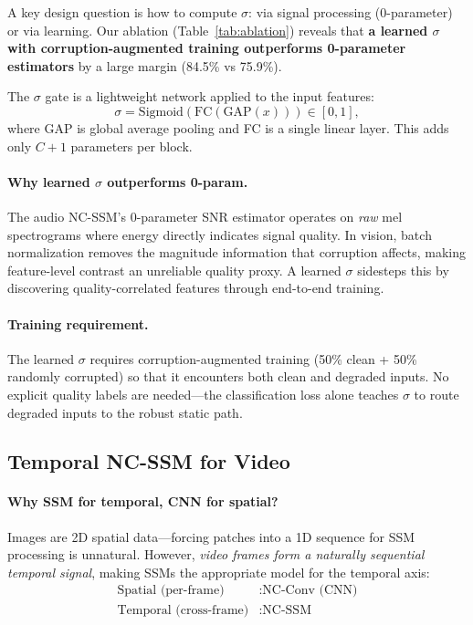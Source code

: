 \documentclass[10pt,twocolumn,letterpaper]{article}
\begin{document}
A key design question is how to compute $\sigma$: via signal processing (0-parameter) or via learning.
Our ablation (Table~\ref{tab:ablation}) reveals that \textbf{a learned $\sigma$ with corruption-augmented training outperforms 0-parameter estimators} by a large margin (84.5\% vs 75.9\%).

The $\sigma$ gate is a lightweight network applied to the input features:
\begin{equation}
\sigma = \text{Sigmoid}\!\left(\text{FC}\!\left(\text{GAP}(x)\right)\right) \in [0, 1],
\label{eq:sigma}
\end{equation}
where GAP is global average pooling and FC is a single linear layer.
This adds only $C + 1$ parameters per block.

\paragraph{Why learned $\sigma$ outperforms 0-param.}
The audio NC-SSM's 0-parameter SNR estimator operates on \emph{raw} mel spectrograms where energy directly indicates signal quality.
In vision, batch normalization removes the magnitude information that corruption affects, making feature-level contrast an unreliable quality proxy.
A learned $\sigma$ sidesteps this by discovering quality-correlated features through end-to-end training.

\paragraph{Training requirement.}
The learned $\sigma$ requires corruption-augmented training (50\% clean + 50\% randomly corrupted) so that it encounters both clean and degraded inputs.
No explicit quality labels are needed---the classification loss alone teaches $\sigma$ to route degraded inputs to the robust static path.


\subsection{Temporal NC-SSM for Video}
\label{sec:temporal}

\paragraph{Why SSM for temporal, CNN for spatial?}
Images are 2D spatial data---forcing patches into a 1D sequence for SSM processing is unnatural.
However, \emph{video frames form a naturally sequential temporal signal}, making SSMs the appropriate model for the temporal axis:
\begin{align}
\text{Spatial (per-frame)}&: \text{NC-Conv (CNN)} \nonumber \\
\text{Temporal (cross-frame)}&: \text{NC-SSM}
\end{align}
\end{document}
